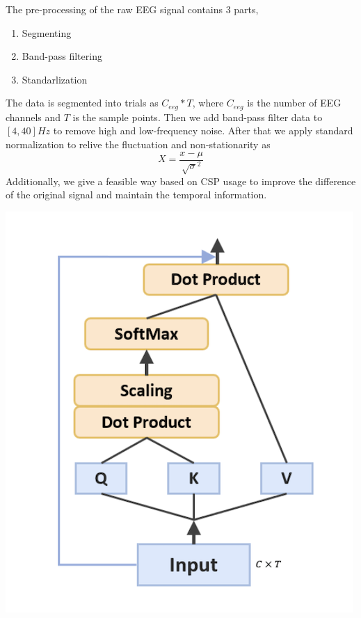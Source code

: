 \documentclass[a0,portrait]{a0poster}
\begin{document}
\begin{minipage}[c]{\linewidth}
\begin{framed}
\begin{multicols}{2}
The pre-processing of the raw EEG signal contains 3 parts, 
\begin{enumerate}
\item Segmenting
\item Band-pass filtering
\item Standarlization
\end{enumerate}
The data is segmented into trials as $C_{eeg}*T$, where $C_{eeg}$ is the number of EEG channels and $T$ is the sample points. Then we add band-pass filter data to $[4,40]Hz$ to remove high and low-frequency noise. After that we apply standard normalization to relive the fluctuation and non-stationarity  as $$X=\frac{{x-\mu}}{{\sqrt{\sigma}^2}}$$Additionally, we give a feasible way based on CSP usage to improve the difference of the original signal and maintain the temporal information.
\begin {center}
\includegraphics{figures/dot}
\label{dot}
\end{center}

\end{multicols}
\end{framed}
\end{minipage}
\end{document}
